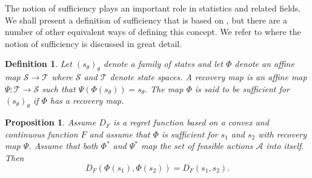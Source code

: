 \documentclass[10pt,a4paper,draft]{article}
\newtheorem{Prop}{Proposition}
\newtheorem{Definition}{Definition}
\begin{document}
The notion of sufficiency plays an important role in statistics and related fields. We shall present a definition of sufficiency that is based on \cite{Petz1988}, but there are a number of other equivalent ways of defining this
concept. We refer to \cite{Jencova2006} where the notion of sufficiency
is discussed in great detail.
\begin{Definition}
Let $\left(s_{\theta}\right)_{\theta}$ denote a family of states and let $\Phi$ denote an affine map
$\mathcal{S}\to\mathcal{T}$
where $\mathcal{S}$ and $\mathcal{T}$ denote state spaces. 
A \emph{recovery map} is an affine map
$\Psi:\mathcal{T}\to\mathcal{S}$
such that $\Psi\left(\Phi\left(s_{\theta}\right)\right)=s_{\theta}.$
The map $\Phi$ is said to be \emph{sufficient} for
$\left(s_{\theta}\right)_{\theta}$
if $\Phi$ has a recovery map. 
\end{Definition}
\begin{Prop}
Assume  $D_{F}$ is a regret function based on a convex and continuous function $F$ and assume that $\Phi$ is sufficient for
$s_{1}$
and $s_{2}$ with recovery map $\Psi$. Assume that both $\Phi^*$ and $\Psi^*$ map the set of feasible actions $\mathcal{A}$ into itself. Then
\[
D_{F}\left(\Phi\left(s_{1}\right),\Phi\left(s_{2}\right)\right)=D_{F}\left(s_{1},s_{2}\right).
\]
\end{Prop}
\end{document}
